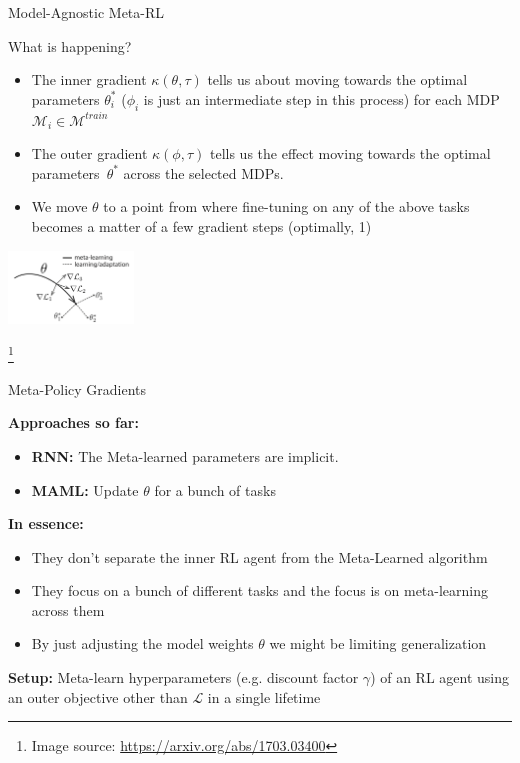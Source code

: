 \documentclass[aspectratio=169]{../latex_main/tntbeamer}  %
\begin{document}
\begin{frame}{Model-Agnostic Meta-RL~}

    What is happening?
    \begin{itemize}
        \item The inner gradient $\kappa(\theta, \tau)$ tells us about moving towards the optimal parameters $\theta_i^*$ ($\phi_i$ is just an intermediate step in this process) for each MDP $\mathcal{M}_i \in \mathcal{M}^{train}$ 
        \item The outer gradient $\kappa(\phi, \tau)$ tells us the effect moving towards the optimal parameters~$\theta^*$ across the selected MDPs.
        \item We move $\theta$ to a point from where fine-tuning on any of the above tasks becomes a matter of a few gradient steps (optimally, 1)
    \end{itemize}

    \centering
    \includegraphics[width=0.25\textwidth]{w09_meta_rl_new/images/t04/maml.png}

    \footnote{Image source: \url{https://arxiv.org/abs/1703.03400}}
    
\end{frame}


\begin{frame}{Meta-Policy Gradients~}
 
    \textbf{Approaches so far:} 
    \begin{itemize}
        \item \textbf{RNN:} The Meta-learned parameters are implicit.
        \item \textbf{MAML:} Update $\theta$ for a bunch of tasks
    \end{itemize}

    \vfill
    \textbf{In essence:}
    \begin{itemize}
        \item They don't separate the inner RL agent from the Meta-Learned algorithm
        \item They focus on a bunch of different tasks and the focus is on meta-learning across them
        \item By just adjusting the model weights $\theta$ we might be limiting generalization
    \end{itemize}

    \vfill
    \textbf{Setup:} Meta-learn hyperparameters (e.g. discount factor  $\gamma$) of an RL agent using an outer objective other than $\mathcal{L}$ in a single lifetime
  
\end{frame}
\end{document}
